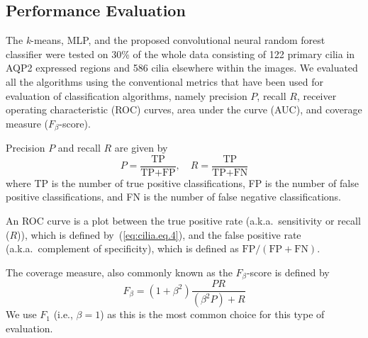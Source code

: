 \subsection{Performance Evaluation}

The \emph{k}-means, MLP, and the proposed convolutional neural random forest classifier were tested on 30\% of the whole data consisting of 122 primary cilia in AQP2 expressed regions and 586 cilia elsewhere within the images. We evaluated all the algorithms using the conventional metrics that have been used for evaluation of classification algorithms, namely precision $P$, recall $R$, receiver operating characteristic (ROC) curves, area under the curve (AUC), and coverage measure ($F_{\beta}$-score).

Precision $P$ and recall $R$ are given by
\begin{equation}
P = \frac{\text{TP}}{\text{TP} + \text{FP}}, \quad R = \frac{\text{TP}}{\text{TP} + \text{FN}}
\label{eq:cilia.eq.4}
\end{equation}
where TP is the number of true positive classifications, FP is the number of false positive classifications, and FN is the number of false negative classifications.

An ROC curve is a plot between the true positive rate (a.k.a.\ sensitivity or recall ($R$)), which is defined by~(\ref{eq:cilia.eq.4}), and the false positive rate (a.k.a.\ complement of specificity), which is defined as $\text{FP}/(\text{FP} + \text{FN})$.

The coverage measure, also commonly known as the $F_{\beta}$-score is defined by
\begin{equation}
F_{\beta} = \left(1 + \beta^{2}\right)\frac{PR}{\left(\beta^{2}P\right) + R}
\label{eq:cilia.eq.5}
\end{equation}
We use $F_{1}$ (i.e., $\beta = 1$) as this is the most common choice for this type of evaluation.

